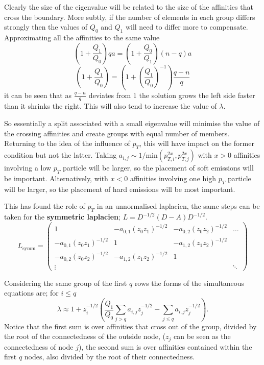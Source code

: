 Clearly the size of the eigenvalue will be related to the size of the affinities that cross the boundary.
More subtly, if the number of elements in each group differs strongly then the values of \(Q_0\) and \(Q_1\)
will need to differ more to compensate.
Approximating all the affinities to the same value
\begin{equation}\left(1 + \frac{Q_1}{Q_0}\right)qa = \left(1 + \frac{Q_0}{Q_1}\right)(n-q)a\end{equation}
\begin{equation}\left(1 + \frac{Q_1}{Q_0}\right) = \left(1 + \left(\frac{Q_1}{Q_0}\right)^{-1}\right)\frac{q-n}{q}\end{equation}
it can be seen that as \(\frac{q-n}{q}\) deviates from \(1\) the solution grows the left side faster than it shrinks the right.
This will also tend to increase the value of \(\lambda\).

So essentially a split associated with a small eigenvalue will minimise the value of the crossing affinities
and create groups with equal number of members.
Returning to the idea of the influence of \(p_T\), this will have impact on the former condition but not the latter.
Taking \(a_{i,j} \sim 1/\text{min}(p_{T,i}^{2x}, p_{T,j}^{2x})\) with \(x>0\) affinities involving a low \(p_T\)
particle will be larger, so the placement of soft emissions will be important.
Alternatively, with \(x < 0\) affinities involving one high \(p_T\) particle will be larger,
so the placement of hard emissions will be most important.

This has found the role of \(p_T\) in an unnormalised laplacien,
the same steps can be taken for the \textbf{symmetric laplacien}; \(L = D^{-1/2}(D -A) D^{-1/2}\).
\begin{equation}
    L_\text{symm} = 
    \begin{pmatrix}
        1 & -a_{0,1}(z_0z_1)^{-1/2} & -a_{0,2}(z_0z_2)^{-1/2} & \hdots \\
        -a_{0,1}(z_0z_1)^{-1/2} & 1 & -a_{1,2}(z_1z_2)^{-1/2} & \\
        -a_{0,2}(z_0z_2)^{-1/2} & -a_{1,2}(z_1z_2)^{-1/2} & 1 & \\
        \vdots   &          &     & \ddots 
    \end{pmatrix}
\end{equation}

Considering the same group of the first \(q\) rows the forms of the simultaneous equations are;
for \(i \leq q\)
\begin{equation}\label{eqn:symm_lamb1}
\lambda \approx 1 + z_i^{-1/2} \left(\frac{Q_1}{Q_0}\sum_{j>q}a_{i,j}z_j^{-1/2} - \sum_{j \leq q} a_{i,j}z_j^{-1/2}\right).
\end{equation}
Notice that the first sum is over affinities that cross out of the group, divided by the root of the connectedness of the outside node,
(\(z_j\) can be seen as the connectedness of node \(j\)), the second sum is over affinities contained within the first \(q\) nodes,
also divided by the root of their connectedness.

